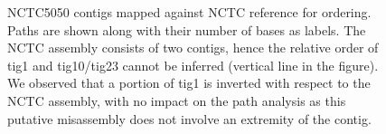 \documentclass[../../main.tex]{subfiles}
\begin{document}
\begin{figure}[!hb]

        


\caption{
NCTC5050 contigs mapped against NCTC reference for ordering. Paths are shown along with their number of bases as labels. The NCTC assembly consists of two contigs, hence the relative order of tig1 and tig10/tig23 cannot be inferred (vertical line in the figure). We observed that a portion of tig1 is inverted with respect to the NCTC assembly, with no impact on the path analysis as this putative misassembly does not involve an extremity of the contig.
%
}
\label{fg:appendix:NCTC5050}
\end{figure}
\end{document}
